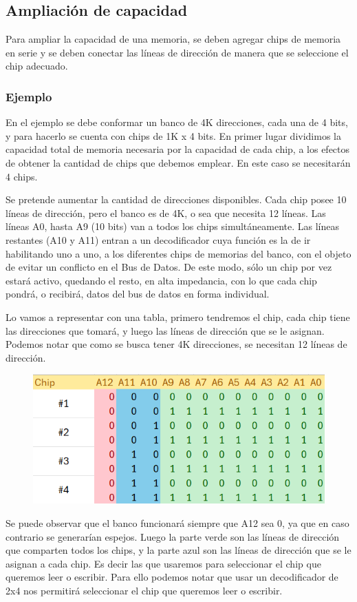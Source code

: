 \subsection{Ampliación de capacidad}
Para ampliar la capacidad de una memoria, se deben agregar chips de memoria en serie y se deben conectar las líneas de dirección de manera que se seleccione el chip adecuado.

\subsubsection{Ejemplo}
En el ejemplo se debe conformar un banco de
4K direcciones, cada una de 4 bits, y para hacerlo se cuenta con chips de 1K x 4 bits. En primer lugar dividimos la capacidad total de memoria necesaria por la capacidad de cada chip, a los efectos de obtener la cantidad de chips que debemos emplear. En este caso se necesitarán 4 chips.

Se pretende aumentar la cantidad de direcciones disponibles. Cada chip posee 10 líneas de dirección, pero el banco es de 4K, o sea que necesita 12 líneas. Las líneas A0, hasta A9 (10 bits) van a todos los chips simultáneamente. Las líneas restantes (A10 y A11) entran a un decodificador cuya función es la de ir habilitando uno a uno, a los diferentes chips de memorias del banco, con el objeto de evitar un conflicto en el Bus de Datos. De este modo, sólo un chip por vez estará activo, quedando el resto, en alta impedancia, con lo que cada chip pondrá, o recibirá, datos del bus de datos en forma individual.

Lo vamos a representar con una tabla, primero tendremos el chip, cada chip tiene las direcciones que tomará, y luego las líneas de dirección que se le asignan. Podemos notar que como se busca tener 4K direcciones, se necesitan 12 líneas de dirección.

\begin{figure}[h]
    \centering
    \includegraphics[scale=0.8]{img/tabla.png}
\end{figure}
Se puede observar que el banco funcionará siempre que A12 sea 0, ya que en caso contrario se generarían espejos. Luego la parte verde son las líneas de dirección que comparten todos los chips, y la parte azul son las líneas de dirección que se le asignan a cada chip. Es decir las que usaremos para seleccionar el chip que queremos leer o escribir. Para ello podemos notar que usar un decodificador de 2x4 nos permitirá seleccionar el chip que queremos leer o escribir.

